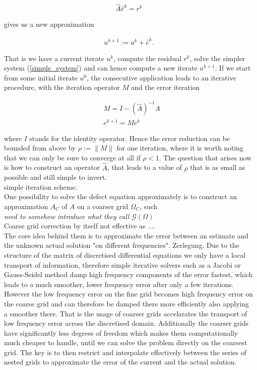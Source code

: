 \documentclass[../draft_1.tex]{subfiles}
\begin{document}
\begin{ceqn}
	\begin{align}
	\label{simple_system}
\hat{A} \hat{e}^k = r^k
	\end{align}
\end{ceqn}
gives us a new approximation 
\begin{ceqn}
	\begin{align}
u^{k+1} := u^k + \hat{e}^k.
	\end{align}
\end{ceqn}
That is we have a current iterate $u^k$, compute the residual $r^k$, solve the simpler system (\ref{simple_system}) and can hence compute a new iterate $u^{k+1}$. If we start from some initial iterate $u^0$, the consecutive application leads to an iterative procedure, with the iteration operator $M$ and the error iteration 
\begin{ceqn}
	\begin{align}
&M = I - (\hat{A})^{-1} A \\
&e^{k+1} = M e^k
	\end{align}
\end{ceqn}
where $I$ stands for the identity operator. Hence the error reduction can be bounded from above by $\rho := \| M \|$ for one iteration, where it is worth noting that we can only be sure to converge at all if $\rho < 1$.  The question that arises now is how to construct an operator $\hat{A}$, that leads to a value of $\rho$ that is as small as possible and still simple to invert. 
\smallskip 
\\
simple iteration scheme. 
\smallskip
\\
One possibility to solve the defect equation approximately is to construct an approximation $A_C$ of $A$ on a coarser grid $\Omega_C$, such 
\smallskip
\\
\textit{need to somehow introduce what they call $\mathcal{G}(\Omega)$}
\smallskip
\\
Coarse grid correction by itself not effective as .... 
\smallskip
\\
The core idea behind them is to approximate the error between an estimate and the unknown actual solution "on different frequencies". Zerlegung. Due to the structure of the matrix of discretised differential equations we only have a local transport of information, therefore simple iterative solvers such as a Jacobi or Gauss-Seidel method damp high frequency components of the error fastest, which leads to a much smoother, lower frequency error after only a few iterations. However the low frequency error on the fine grid becomes high frequency error on the coarse grid and can therefore be damped there more efficiently also applying a smoother there. That is the usage of coarser grids accelarates the transport of low frequency error across the discretised domain. Additionally the coarser grids have significantly less degrees of freedom which makes them computationally much cheaper to handle, until we can solve the problem directly on the coarsest grid. The key is to then restrict and interpolate effectively between the series of nested grids to approximate the error of the current and the actual solution. 
\end{document}
